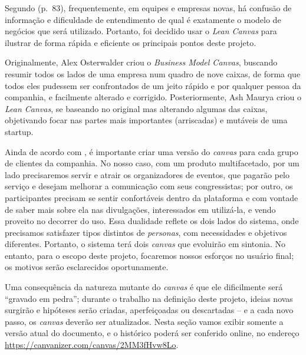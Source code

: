 \documentclass[12pt,a4paper,twoside,hyphens,english,brazil]{abntex2}
\begin{document}
Segundo \citeauthor{manual-startup} (p.~83), frequentemente, em equipes e empresas novas, há confusão de informação e dificuldade de entendimento de qual é exatamente o modelo de negócios que será utilizado. Portanto, foi decidido usar o \emph{Lean Canvas} para ilustrar de forma rápida e eficiente os principais pontos deste projeto.

Originalmente, Alex Osterwalder criou o \emph{Business Model Canvas}, buscando resumir todos os lados de uma empresa num quadro de nove caixas, de forma que todos eles pudessem ser confrontados de um jeito rápido e por qualquer pessoa da companhia, e facilmente alterado e  corrigido. Posteriormente, Ash Maurya criou o \emph{Lean Canvas}, se baseando no original mas alterando algumas das caixas, objetivando focar nas partes mais importantes (arriscadas) e mutáveis de uma startup.\cite{why-lean-canvas}

Ainda de acordo com \citeauthor{lean-canvas}, é importante criar uma versão do \emph{canvas} para cada grupo de clientes da companhia. No nosso caso, com um produto multifacetado, por um lado precisaremos servir e atrair os organizadores de eventos, que pagarão pelo serviço e desejam melhorar a comunicação com seus congressistas; por outro, os participantes precisam se sentir confortáveis dentro da plataforma e com vontade de saber mais sobre ela nas divulgações, interessados em utilizá-la, e vendo proveito no decorrer do uso. Essa dualidade reflete os dois lados do sistema, onde precisamos satisfazer tipos distintos de \emph{personas}, com necessidades e objetivos diferentes. Portanto, o sistema terá dois \emph{canvas} que evoluirão em sintonia. No entanto, para o escopo deste projeto, focaremos nossos esforços no usuário final; os motivos serão esclarecidos oportunamente. %

Uma consequência da natureza mutante do \emph{canvas} é que ele dificilmente será ``gravado em pedra''; durante o trabalho na definição deste projeto, ideias novas surgirão e hipóteses serão criadas, aperfeiçoadas ou descartadas -- e a cada novo passo, os \emph{canvas} deverão ser atualizados. Nesta seção vamos exibir somente a versão atual do documento, e o histórico poderá ser conferido online, no endereço \mbox{\url{https://canvanizer.com/canvas/2MM3fHvw8Lo}}.

\end{document}
